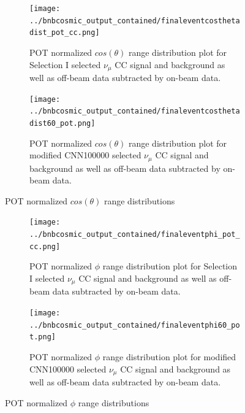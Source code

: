 \begin{figure}[htp!]
\centering
	\begin{subfigure}[t]{.475\textwidth}
		\texttt{[image: ../bnbcosmic\_output\_contained/finaleventcosthetadist\_pot\_cc.png]}
		\caption{POT normalized $cos(\theta)$ range distribution plot for Selection I selected $\nu_{\mu}$ CC signal and background as well as off-beam data subtracted by on-beam data.} 
		\label{fig:ccpotcostheta_modified}
	\end{subfigure}
	\begin{subfigure}[t]{.475\textwidth}
	\centering
		\texttt{[image: ../bnbcosmic\_output\_contained/finaleventcosthetadist60\_pot.png]}
		\caption{POT normalized $cos(\theta)$ range distribution plot for modified CNN100000 selected $\nu_{\mu}$ CC signal and background as well as off-beam data subtracted by on-beam data.} 
	\label{fig:cnnpotcostheta_modified}
	\end{subfigure}
\caption{POT normalized $cos(\theta)$ range distributions}
\label{fig:potcostheta_modified}
\end{figure}

\begin{figure}[htp!]
\centering
	\begin{subfigure}[t]{.475\textwidth}
		\texttt{[image: ../bnbcosmic\_output\_contained/finaleventphi\_pot\_cc.png]}
		\caption{POT normalized $\phi$ range distribution plot for Selection I selected $\nu_{\mu}$ CC signal and background as well as off-beam data subtracted by on-beam data.} 
		\label{fig:ccpotphi_modified}
	\end{subfigure}
	\begin{subfigure}[t]{.475\textwidth}
	\centering
		\texttt{[image: ../bnbcosmic\_output\_contained/finaleventphi60\_pot.png]}
		\caption{POT normalized $\phi$ range distribution plot for modified CNN100000 selected $\nu_{\mu}$ CC signal and background as well as off-beam data subtracted by on-beam data.} 
	\label{fig:cnnpotphi_modified}
	\end{subfigure}
\caption{POT normalized $\phi$ range distributions}
\label{fig:potphi_modified}
\end{figure}


